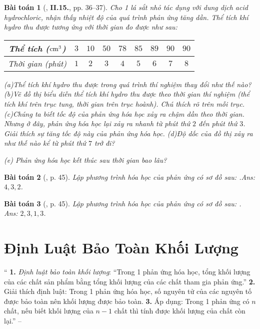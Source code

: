 \documentclass{article}
\numberwithin{equation}{section}
\newtheorem{baitoan}{Bài toán}
\begin{document}
\begin{baitoan}[\cite{Truong_BTNC_Hoa_Hoc_8_2022}, \textbf{II.15.}, pp. 36--37]
	Cho 1 lá sắt nhỏ tác dụng với dung dịch acid hydrochloric, nhận thấy nhiệt độ của quá trình phản ứng tăng dần. Thể tích khí hydro thu được tương ứng với thời gian đo được như sau:
	
	\begin{table}[H]
		\centering
		\begin{tabular}{|c|c|c|c|c|c|c|c|c|}
			\hline
			Thể tích ($\rm cm^3$) & $3$ & $10$ & $50$ & $78$ & $85$ & $89$ & $90$ & $90$ \\
			\hline
			Thời gian (phút) & $1$ & $2$ & $3$ & $4$ & $5$ & $6$ & $7$ & $8$ \\
			\hline
		\end{tabular}
	\end{table}
	
		(a)Thể tích khí hydro thu được trong quá trình thí nghiệm thay đổi như thế nào?
		(b)Vẽ đồ thị biểu diễn thể tích khí hydro thu được theo thời gian thí nghiệm (thể tích khí trên trục tung, thời gian trên trục hoành). Chú thích rõ trên mỗi trục.
		(c)Chúng ta biết tốc độ của phản ứng hóa học xảy ra chậm dần theo thời gian. Nhưng ở đây, phản ứng hóa học lại xảy ra nhanh từ phút thứ $2$ đến phút thứ $3$. Giải thích sự tăng tốc độ này của phản ứng hóa học.
		(d)Độ dốc của đồ thị xảy ra như thế nào kể từ phút thứ $7$ trở đi?
		\item[(e)] Phản ứng hóa học kết thúc sau thời gian bao lâu?
	
\end{baitoan}

\begin{baitoan}[\cite{An_400_BT_Hoa_Hoc_8_2020}, p. 45]
	Lập phương trình hóa học của phản ứng có sơ đồ sau: \emph{}.\hfill\textsf{Ans:} $4,3,2$.
\end{baitoan}

\begin{baitoan}[\cite{An_400_BT_Hoa_Hoc_8_2020}, p. 45]
	Lập phương trình hóa học của phản ứng có sơ đồ sau: \emph{}.\\\mbox{}\hfill\textsf{Ans:} $2,3,1,3$.
\end{baitoan}


\section{Định Luật Bảo Toàn Khối Lượng}
``
	{\bf 1.} \textit{Định luật bảo toàn khối lượng}: ``Trong 1 phản ứng hóa học, tổng khối lượng của các chất sản phẩm bằng tổng khối lượng của các chất tham gia phản ứng.''
	{\bf 2.} Giải thích định luật: Trong 1 phản ứng hóa học, số nguyên tử của các nguyên tố được bảo toàn nên khối lượng được bảo toàn.
	{\bf 3.} Áp dụng: Trong 1 phản ứng có $n$ chất, nếu biết khối lượng của $n - 1$ chất thì tính được khối lượng của chất còn lại.'' -- \cite[p. 37]{Truong_BTNC_Hoa_Hoc_8_2022}
\end{document}
